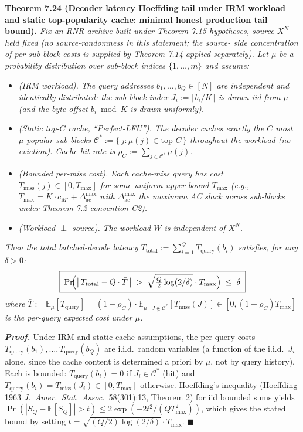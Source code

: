 \documentclass[
]{article}
\begin{document}
\textbf{Theorem 7.24 (Decoder latency Hoeffding tail under IRM
workload and static top-popularity cache: minimal honest production
tail bound).}
\emph{Fix an RNR archive built under Theorem 7.15 hypotheses, source
$X^N$ held fixed (no source-randomness in this statement; the source-
side concentration of per-sub-block costs is supplied by Theorem 7.14
applied separately). Let $\mu$ be a probability distribution over
sub-block indices $\{1, \ldots, m\}$ and assume:}
\begin{itemize}
\item \emph{(IRM workload).} \emph{The query addresses
$b_1, \ldots, b_Q \in [N]$ are independent and identically distributed:
the sub-block index $J_i := \lceil b_i / K \rceil$ is drawn iid from
$\mu$ (and the byte offset $b_i \bmod K$ is drawn uniformly).}
\item \emph{(Static top-$C$ cache, ``Perfect-LFU'').} \emph{The
decoder caches exactly the $C$ most $\mu$-popular sub-blocks
$\mathcal{C}^* := \{\,j : \mu(j) \in \text{top-}C\,\}$ throughout the
workload (no eviction). Cache hit rate is
$\rho_C := \sum_{j \in \mathcal{C}^*} \mu(j)$.}
\item \emph{(Bounded per-miss cost).} \emph{Each cache-miss query has
cost $T_{\mathrm{miss}}(j) \in [0, T_{\max}]$ for some uniform upper
bound $T_{\max}$ (e.g., $T_{\max} = K \cdot c_{M'} + \Delta_{\mathrm{ac}}^{\max}$
with $\Delta_{\mathrm{ac}}^{\max}$ the maximum AC slack across sub-blocks
under Theorem 7.2 convention C2).}
\item \emph{(Workload $\perp$ source).} \emph{The workload $W$ is
independent of $X^N$.}
\end{itemize}
\emph{Then the total batched-decode latency
$T_{\mathrm{total}} := \sum_{i=1}^Q T_{\mathrm{query}}(b_i)$ satisfies,
for any $\delta > 0$:}
\[
\boxed{\;
\Pr\!\Bigl(\bigl|\,T_{\mathrm{total}} - Q \cdot \bar{T}\,\bigr|
\;>\;
\sqrt{\tfrac{Q}{2} \log(2/\delta)} \cdot T_{\max}\Bigr)
\;\leq\;
\delta\;
}
\]
\emph{where $\bar{T} := \mathbb{E}_\mu[T_{\mathrm{query}}] =
(1 - \rho_C) \cdot \mathbb{E}_{\mu \mid J \notin \mathcal{C}^*}
[T_{\mathrm{miss}}(J)] \in [0, (1-\rho_C) T_{\max}]$ is the per-query
expected cost under $\mu$.}

\emph{\textbf{Proof.}} Under IRM and static-cache assumptions, the
per-query costs $T_{\mathrm{query}}(b_1), \ldots, T_{\mathrm{query}}(b_Q)$
are i.i.d.\ random variables (a function of the i.i.d.\ $J_i$ alone,
since the cache content is determined a priori by $\mu$, not by query
history). Each is bounded: $T_{\mathrm{query}}(b_i) = 0$ if
$J_i \in \mathcal{C}^*$ (hit) and $T_{\mathrm{query}}(b_i) =
T_{\mathrm{miss}}(J_i) \in [0, T_{\max}]$ otherwise. Hoeffding's
inequality (Hoeffding 1963 \emph{J.\ Amer.\ Stat.\ Assoc.}\
58(301):13, Theorem 2) for iid bounded sums yields
$\Pr(|S_Q - \mathbb{E}[S_Q]| > t) \leq 2 \exp(-2t^2/(Q T_{\max}^2))$,
which gives the stated bound by setting $t = \sqrt{(Q/2)\log(2/\delta)}
\cdot T_{\max}$.
\hfill$\blacksquare$
\end{document}
